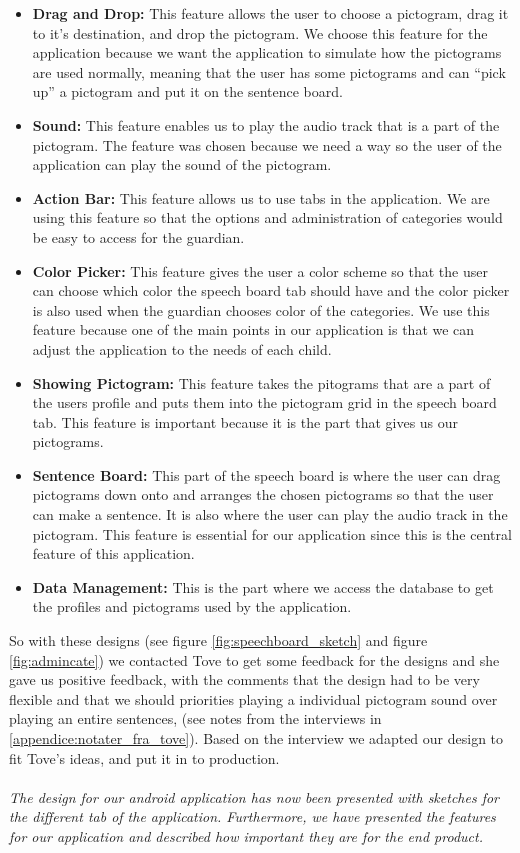 \begin{itemize}
	\item \textbf{Drag and Drop:} This feature allows the user to choose a pictogram, drag it to it's destination, and drop the pictogram.  We choose this feature for the application because we want the application to simulate how the pictograms are used normally, meaning that the user has some pictograms and can ``pick up'' a pictogram and put it on the sentence board.  
	\item \textbf{Sound:} This feature enables us to play the audio track that is a part of the pictogram. The feature was chosen because we need a way so the user of the application can play the sound of the pictogram. 
	\item \textbf{Action Bar:} This feature allows us to use tabs in the application. We are using this feature so that the options and administration of categories would be easy to access for the guardian. 
	\item \textbf{Color Picker:} This feature gives the user a color scheme so that the user can choose which color the speech board tab should have and the color picker is also used when the guardian chooses color of the categories. We use this feature because one of the main points in our application is that we can adjust the application to the needs of each child. 
	\item \textbf{Showing Pictogram:} This feature takes the pitograms that are a part of the users profile and puts them into the pictogram grid in the speech board tab. This feature is important because it is the part that gives us our pictograms. 
	\item \textbf{Sentence Board:} This part of the speech board is where the user can drag pictograms down onto and arranges the chosen pictograms so that the user can make a sentence. It is also where the user can play the audio track in the pictogram. This feature is essential for our application since this is the central feature of this application. 
	\item \textbf{Data Management:} This is the part where we access the database to get the profiles and pictograms used by the application.
\end{itemize}

So with these designs (see figure \ref{fig:speechboard_sketch} and figure \ref{fig:admincate}) we contacted Tove to get some feedback for the designs and she gave us positive  feedback, with the comments that the design had to be very flexible and that we should priorities playing a individual pictogram sound over playing an entire sentences, (see notes from the interviews in \autoref{appendice:notater_fra_tove}). Based on the interview we adapted our design to fit Tove's ideas, and put it in to production.\\  
\\
\textit{The design for our android application has now been presented with sketches for the different tab of the application. Furthermore, we have presented the features for our application and described how important they are for the end product.} 